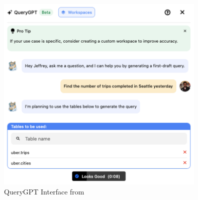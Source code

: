         \begin{figure}[H]
            \centering
            \includegraphics[width=10cm]{chapters/2/figures/query-gpt-ui.png}
            \caption[QueryGPT Interface]{QueryGPT Interface  from~\cite{QueryGPT}}
            \label{fig:query-gpt-interface}
        \end{figure}
        
